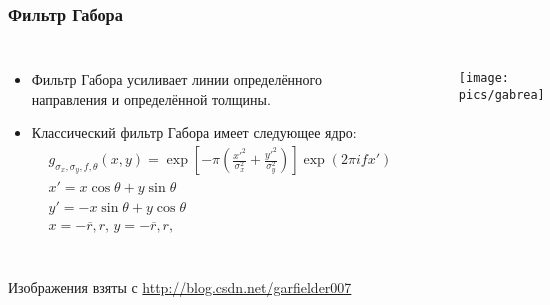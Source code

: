 \documentclass{beamer}
\begin{document}

\begin{frame}
	\frametitle{Фильтр Габора}
	
	\begin{columns}[c]
		\begin{itemize}
			\item Фильтр Габора усиливает линии определённого направления и определённой толщины.
			\item Классический фильтр Габора имеет следующее ядро:
			\begin{equation}
				\begin{split}
					&g_{\sigma_x, \sigma_y, f, \theta}(x, y) = \exp\left[ -\pi \left(  \frac{x'^2}{\sigma_x^2} + \frac{y'^2}{\sigma_y^2} \right) \right] \exp\left( 2\pi i f	 x' \right) \\
					&x' = x\cos\theta + y\sin\theta \\ 
					&y' = -x\sin\theta + y\cos\theta \\ \nonumber
					&x = \overline{-r, r}, \, y = \overline{-r, r},
				\end{split}
				\label{formula:gabor}
			\end{equation}
		\end{itemize}
		
			\begin{figure}[t]
			\texttt{[image: pics/gabrea]}
			\label{fig:gabrea}
			\end{figure}
			
			\vspace{3cm}
	\end{columns}
	\vspace{0.5cm}
	{\color{gray} \scriptsize Изображения взяты с \url{http://blog.csdn.net/garfielder007}}
\end{frame}

\end{document}
